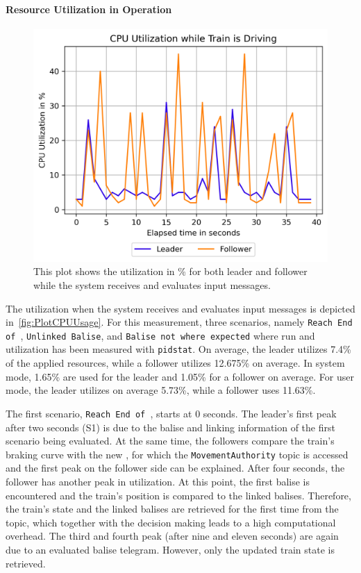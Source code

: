 \paragraph{Resource Utilization in Operation}

\begin{figure}[!hb]
	\centering
	\includegraphics[width=0.75\linewidth]{images/plots/CPUUsage}
	\caption{This plot shows the  utilization in \% for both leader and follower while the system receives and evaluates input messages.}
	\label{fig:PlotCPUUsage}
\end{figure}

The  utilization when the system receives and evaluates input messages is depicted in~\autoref{fig:PlotCPUUsage}.
For this measurement, three scenarios, namely \texttt{Reach End of }, \texttt{Unlinked Balise}, and \texttt{Balise not where expected} where run and  utilization has been measured with \texttt{pidstat}.
On average, the leader utilizes 7.4\% of the applied  resources, while a follower utilizes 12.675\% on average.
In system mode, 1.65\% are used for the leader and 1.05\% for a follower on average.
For user mode, the leader utilizes on average 5.73\%, while a follower uses 11.63\%.

The first scenario, \texttt{Reach End of }, starts at 0 seconds.
The leader's first peak after two seconds (S1) is due to the balise and linking information of the first scenario being evaluated.
At the same time, the followers compare the train's braking curve with the new , for which the \texttt{MovementAuthority} topic is accessed and the first peak on the follower side can be explained.
After four seconds, the follower has another peak in  utilization.
At this point, the first balise is encountered and the train's position is compared to the linked balises.
Therefore, the train's state and the linked balises are retrieved for the first time from the topic, which together with the decision making leads to a high computational overhead.
The third and fourth peak (after nine and eleven seconds) are again due to an evaluated balise telegram.
However, only the updated train state is retrieved.

